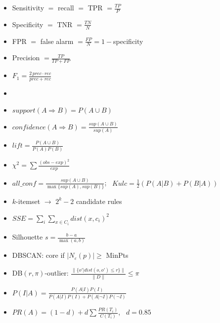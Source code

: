 {\begin{itemize}
  \item Sensitivity $=$ recall $=$ TPR $=\frac{TP}{P}$
  \item Specificity $=$ TNR $=\frac{TN}{N}$
  \item FPR $=$ false alarm $=\frac{FP}{N}=1-$specificity
  \item Precision $=\frac{TP}{TP+FP}$
  \item $F_1=\frac{2\,prec\cdot rec}{prec+rec}$
  \item {}
\end{itemize}
\begin{itemize}
  \item $support(A\Rightarrow B)=P(A\cup B)$
  \item $confidence(A\Rightarrow B)=\frac{sup(A\cup B)}{sup(A)}$
  \item $lift=\frac{P(A\cup B)}{P(A)P(B)}$ \ 
  \item $\chi^2=\sum\frac{(obs-exp)^2}{exp}$
  \item $all\_conf=\frac{sup(A\cup B)}{\max\{sup(A),sup(B)\}}$;
        \ $Kulc=\frac{1}{2}(P(A|B)+P(B|A))$
  \item $k$-itemset $\rightarrow$ $2^k-2$ candidate rules
\end{itemize}
\begin{itemize}
  \item $SSE=\sum_i\sum_{x\in C_i} dist(x,c_i)^2$
  \item Silhouette $s=\frac{b-a}{\max(a,b)}$
  \item DBSCAN: core if $|N_\varepsilon(p)|\ge$ MinPts
\end{itemize}
\begin{itemize}
  \item DB$(r,\pi)$-outlier: $\frac{\lVert\{o'|dist(o,o')\le r\}\rVert}{\lVert D\rVert}\le\pi$
  \item $P(I|A)=\frac{P(A|I)P(I)}{P(A|I)P(I)+P(A|\lnot I)P(\lnot I)}$
  \item $PR(A)=(1-d)+d\sum\frac{PR(T_i)}{C(T_i)}$, \ $d=0.85$
\end{itemize}}

\hr


